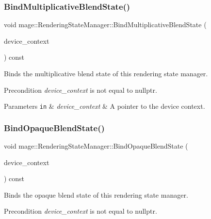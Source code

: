 \subsubsection{\texorpdfstring{Bind\+Multiplicative\+Blend\+State()}{BindMultiplicativeBlendState()}}
{\footnotesize\ttfamily void mage\+::\+Rendering\+State\+Manager\+::\+Bind\+Multiplicative\+Blend\+State (\begin{DoxyParamCaption}\item[{I\+D3\+D11\+Device\+Context2 $\ast$}]{device\+\_\+context }\end{DoxyParamCaption}) const\hspace{0.3cm}{\ttfamily [noexcept]}}

Binds the multiplicative blend state of this rendering state manager.

\begin{DoxyPrecond}{Precondition}
{\itshape device\+\_\+context} is not equal to {\ttfamily nullptr}. 
\end{DoxyPrecond}

\begin{DoxyParams}[1]{Parameters}
\mbox{\tt in}  & {\em device\+\_\+context} & A pointer to the device context. \\
\hline
\end{DoxyParams}
\hypertarget{classmage_1_1_rendering_state_manager_af84fb336aaa4ec5186c6c4ebf6909abf}{}\label{classmage_1_1_rendering_state_manager_af84fb336aaa4ec5186c6c4ebf6909abf} 
\subsubsection{\texorpdfstring{Bind\+Opaque\+Blend\+State()}{BindOpaqueBlendState()}}
{\footnotesize\ttfamily void mage\+::\+Rendering\+State\+Manager\+::\+Bind\+Opaque\+Blend\+State (\begin{DoxyParamCaption}\item[{I\+D3\+D11\+Device\+Context2 $\ast$}]{device\+\_\+context }\end{DoxyParamCaption}) const\hspace{0.3cm}{\ttfamily [noexcept]}}

Binds the opaque blend state of this rendering state manager.

\begin{DoxyPrecond}{Precondition}
{\itshape device\+\_\+context} is not equal to {\ttfamily nullptr}. 
\end{DoxyPrecond}


